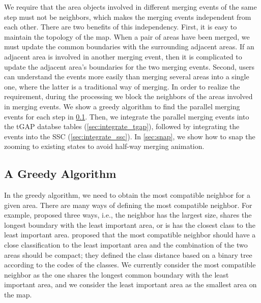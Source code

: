 \documentclass[ijgi,article,submit,moreauthors,pdftex]{Definitions/mdpi}
\begin{document}
We require that 
the area objects involved in different merging events of the same step 
must not be neighbors, 
which makes the merging events independent from each other.
There are two benefits of this independency.
First, it is easy to maintain the topology of the map.
When a pair of areas have been merged, 
we must update the common boundaries with the surrounding adjacent areas.
If an adjacent area is involved in another merging event,
then it is complicated to update the adjacent area's boundaries
for the two merging events.
Second, users can understand the events more easily 
than merging several areas into a single one,
where the latter is a traditional way of merging.
In order to realize the requirement, during the processing 
we block the neighbors of the areas involved in merging events.
We show a greedy algorithm to find the parallel merging events for each step
in \sect\ref{sec:greedy_algo}.
Then, we integrate the parallel merging events into the tGAP databse tables
(\sect\ref{sec:integrate_tgap}),
followed by integrating the events into the SSC 
(\sect\ref{sec:integrate_ssc}).
In \sect\ref{sec:snap}, we show how to snap the zooming to existing states
to avoid half-way merging animation.

\subsection{A Greedy Algorithm}
\label{sec:greedy_algo}

In the greedy algorithm, we need to obtain the most compatible neighbor 
for a given area.
There are many ways of defining the most compatible neighbor.
For example, \citet{Cheng2006} proposed three ways, i.e.,
the neighbor has the largest size, 
shares the longest boundary with the least important area,
or is has the closest class to the least important area. 
\citet{Peng2017AStar} proposed that 
the most compatible neighbor should have a close classification
to the least important area
and the combination of the two areas should be compact;
they defined the class distance based on a binary tree
according to the codes of the classes.
We currently consider the most compatible neighbor
as the one shares the longest common boundary 
with the least important area,
and we consider the least important area 
as the smallest area on the map.
\end{document}
